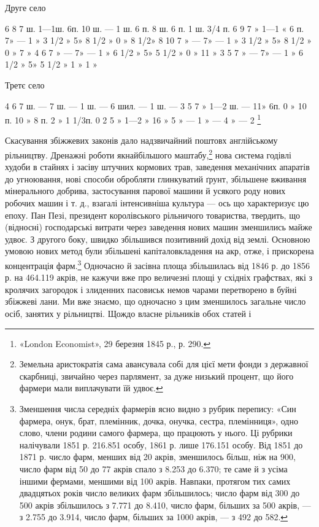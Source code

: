 Друге село

6    8    7 ш.    1—1ш. 6п.    10 ш. —  1 ш. 6       п.    8 ш. 6        п.  1 ш. 3/4   п.
6    9    7  »     1—1 «  6 п.     7»      —  1 »    3 1/2 »    5»     8 1/2 »    0 »    8 1/2»
8    10  7  »        —                  7»      —  1 »    3 1/2 »    5»     8 1/2 »    0 »    7
 »
4    6    7  »        —                  7»      —  1 »     6 1/2 »   5»     5 1/2 »    0 »  11
 »
3    5    7  »        —                  7»      —  1 »     6 1/2 »   5»     5 1/2 »    1 »    1
  »

Третє село

4    6    7 ш.         —         7 ш.   —     1 ш.    —       6  шил. —     1 ш.       —
3    5    7  »  1—2 ш. —   11»     6п.   0 »    10 п.   10  »       8 п.  2 »     1 1/3п.
0    2    5  »  1—2 » 16 »  5  »     —     1 »     —         4   »    —        2 \footnote{
«London Economist», 29 березня 1845 р., р. 290.
}

Скасування збіжжевих законів дало надзвичайний поштовх
англійському рільництву. Дренажні роботи якнайбільшого маштабу,\footnote{
Земельна аристократія сама авансувала собі для цієї мети фонди
з державної скарбниці, звичайно через парлямент, за дуже низький
процент, що його фармери мали виплачувати їй удвоє.
}
нова система годівлі худоби в стайнях і засіву штучних
кормових трав, заведення механічних апаратів до угноювання,
нові способи обробляти глинкуватий ґрунт, збільшене вживання
мінерального добрива, застосування парової машини й
усякого роду нових робочих машин і т. д., взагалі інтенсивніша
культура — ось що характеризує цю епоху. Пан Пезі, президент
королівського рільничого товариства, твердить, що (відносні)
господарські витрати через заведення нових машин зменшились
майже удвоє. З другого боку, швидко збільшився позитивний
дохід від землі. Основною умовою нових метод були збільшені
капіталовкладення на акр, отже, і прискорена концентрація
фарм.\footnote{
Зменшення числа середніх фармерів ясно видно з рубрик перепису:
«Син фармера, онук, брат, племінник, дочка, онучка, сестра, племінниця»,
одно слово, члени родини самого фармера, що працюють у
нього. Ці рубрики налічували 1851 р. 216.851 особу, 1861 р. лише 176.151
особу. Від 1851 до 1871 р. число фарм, менших від 20 акрів, зменшилось
більш, ніж на 900, число фарм від 50 до 77 акрів спало з 8.253 до 6.370;
те саме й з усіма іншими фермами, меншими від 100 акрів. Навпаки,
протягом тих самих двадцятьох років число великих фарм збільшилось;
число фарм від 300 до 500 акрів збільшилось з 7.771 до 8.410, число
фарм, більших за 500 акрів, — з 2.755 до 3.914, число фарм, більших
за 1000 акрів, — з 492 до 582.
} Одночасно й засівна площа збільшилась від 1846 р.
до 1856 р. на 464.119 акрів, не кажучи вже про величезні площі
у східніх графствах, які з кролячих загородок і злиденних пасовиськ
немов чарами перетворено в буйні збіжжеві лани. Ми вже
знаємо, що одночасно з цим зменшилось загальне число осіб,
занятих у рільництві. Щождо власне рільників обох статей і
\parbreak{}  %
